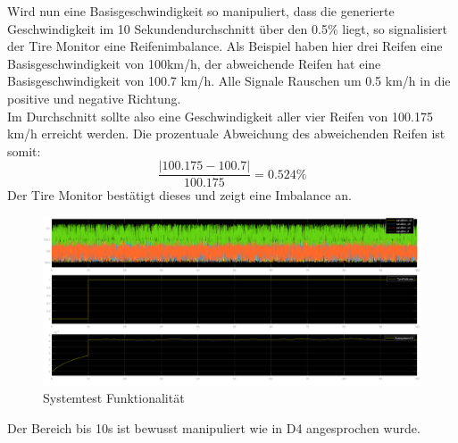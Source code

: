 Wird nun eine Basisgeschwindigkeit so manipuliert, dass die generierte Geschwindigkeit im 10 Sekundendurchschnitt über den 0.5\% liegt, so signalisiert der Tire Monitor eine Reifenimbalance. Als Beispiel haben hier drei Reifen eine Basisgeschwindigkeit von 100km/h, der abweichende Reifen hat eine Basisgeschwindigkeit von 100.7 km/h. Alle Signale Rauschen um 0.5 km/h in die positive und negative Richtung.\\
Im Durchschnitt sollte also eine Geschwindigkeit aller vier Reifen von 100.175 km/h erreicht werden. Die prozentuale Abweichung des abweichenden Reifen ist somit:
$$
\dfrac{|100.175-100.7|}{100.175} = 0.524\%
$$
Der Tire Monitor bestätigt dieses und zeigt eine Imbalance an.
\begin{figure}[H]
	\centering
	\includegraphics[width=0.95\linewidth]{../Graphiken/RandomAbweichung}
	\caption{Systemtest Funktionalität}
	\label{fig:funkt}
\end{figure}
Der Bereich bis 10s ist bewusst manipuliert wie in D4 angesprochen wurde.
